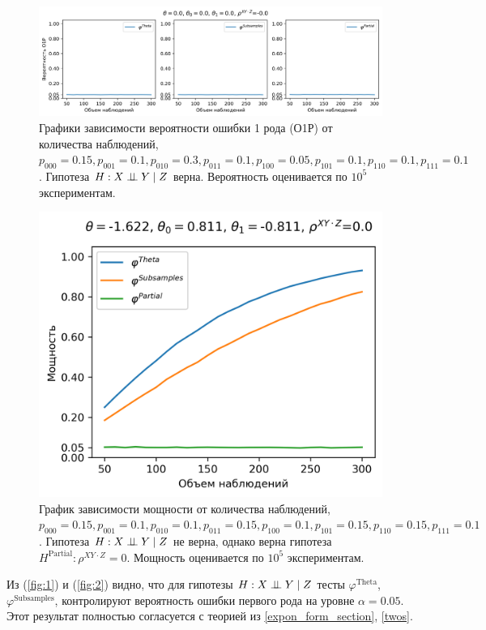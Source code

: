 \begin{figure}[H]
    \centering
    \includegraphics[scale=0.5]{images/graph2.png}
    \caption{Графики зависимости вероятности ошибки 1 рода (О1Р) от количества наблюдений,
    $p_{000}=0.15, p_{001}=0.1, p_{010}=0.3, p_{011}=0.1,
    p_{100}=0.05, p_{101}=0.1, p_{110}=0.1, p_{111}=0.1$. 
    Гипотеза $H: X \perp\!\!\!\perp Y \mid Z$ верна.
    Вероятность оценивается по $10^5$ экспериментам.} \label{fig:2}
\end{figure}

\begin{figure}[H]
    \centering
    \includegraphics[scale=0.55]{images/graph4.png}
    \caption{График зависимости мощности от количества наблюдений,
    $p_{000}=0.15, p_{001}=0.1, 
    p_{010}=0.1, p_{011}=0.15,
    p_{100}=0.1, p_{101}=0.15, p_{110}=0.15, p_{111}=0.1$. 
    Гипотеза $H: X \perp\!\!\!\perp Y \mid Z$ не верна, 
    однако верна гипотеза 
    $H^{\text{Partial}}: \rho^{XY\cdot Z}=0$.
    Мощность оценивается по $10^5$ экспериментам.} \label{fig:4}
\end{figure}

Из (\autoref{fig:1}) и (\autoref{fig:2}) видно, что 
для гипотезы $H: X \perp\!\!\!\perp Y \mid Z$ тесты 
$\varphi^{\text{Theta}}$, $\varphi^{\text{Subsamples}}$, контролируют вероятность 
ошибки первого рода на уровне $\alpha=0.05$. Этот результат
полностью согласуется с теорией из \autoref{expon_form_section}, 
\autoref{twos}.

